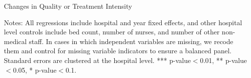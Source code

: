 \documentclass[12pt]{article}
\begin{document}
\newpage
{}
\setlength{\captionmargin}{.5 \textwidth} \addtolength{\captionmargin}{-.5\wd\gfxbox}
\begin{table}[htbp!]
\centering
\caption{Changes in Quality or Treatment Intensity}
\label{tab:other_results}
\usebox{\gfxbox}
\par
\begin{minipage}{\wd\gfxbox}
\footnotesize
Notes: All regressions include hospital and year fixed effects, and other hospital level controls include bed count, number of nurses, and number of other non-medical staff. In cases in which independent variables are missing, we recode them and control for missing variable indicators to ensure a balanced panel.  Standard errors are clustered at the hospital level.   *** p-value$<$0.01, ** p-value$<$0.05, * p-value$<$0.1.
\end{minipage}
\end{table}
\end{document}
